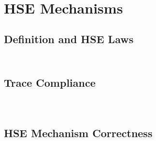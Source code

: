 \inputminted[gobble=2,firstline=90,lastline=92]{coq}{Listings/SpecCert.v}

\inputminted[gobble=2,firstline=94,lastline=99]{coq}{Listings/SpecCert.v}

\inputminted[gobble=2,firstline=101,lastline=109]{coq}{Listings/SpecCert.v}

\section{HSE Mechanisms}

\subsection{Definition and HSE Laws}

\inputminted[gobble=2,firstline=111,lastline=120]{coq}{Listings/SpecCert.v}

\inputminted[gobble=2,firstline=122,lastline=138]{coq}{Listings/SpecCert.v}

\subsection{Trace Compliance}

\inputminted[gobble=2,firstline=146,lastline=155]{coq}{Listings/SpecCert.v}

\inputminted[gobble=2,firstline=157,lastline=181]{coq}{Listings/SpecCert.v}

\inputminted[gobble=2,firstline=183,lastline=228]{coq}{Listings/SpecCert.v}

\subsection{HSE Mechanism Correctness}

\inputminted[gobble=2,firstline=230,lastline=235]{coq}{Listings/SpecCert.v}

\inputminted[gobble=2,firstline=237,lastline=259]{coq}{Listings/SpecCert.v}
